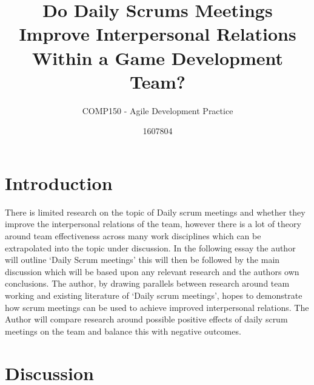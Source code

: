 \documentclass{scrartcl}
\title{Do Daily Scrums Meetings Improve Interpersonal Relations Within a Game Development Team?}
\subtitle{COMP150 - Agile Development Practice}
\author{1607804}
\begin{document}
\maketitle


\section{Introduction}
There is limited research on the topic of Daily scrum meetings and whether they improve the interpersonal relations of the team, however there is a lot of theory around team effectiveness across many work disciplines which can be extrapolated into the topic under discussion. 
In the following essay the author will outline ‘Daily Scrum meetings’ this will then be followed by the main discussion which will be based upon any relevant research and the authors own conclusions. 
 The author, by drawing parallels between research around team working and existing literature of ‘Daily scrum meetings’, hopes to demonstrate how scrum meetings can be used to achieve improved interpersonal relations. 
The Author will compare research around possible positive effects of daily scrum meetings on the team and balance this with negative outcomes. 


\section{Discussion}
\end{document}
